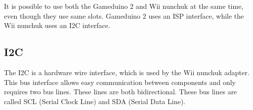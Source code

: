 It is possible to use both the Gameduino 2 and Wii
nunchuk at the same time, even though they use same slots.
Gameduino 2 uses an ISP interface, while the Wii nunchuk uses an I2C interface.


\subsection*{I2C}
The I2C is a hardware wire interface, which is used by the Wii nunchuk adapter. This bus
interface allows easy communication between components and only requires two
bus lines. These lines are both bidirectional. These bus lines are called SCL
(Serial Clock Line) and SDA (Serial Data Line).
